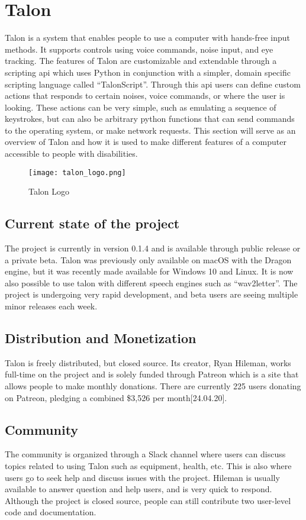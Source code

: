 \documentclass[../thesis.tex]{subfiles}
\begin{document}
\chapter{Talon}\label{talon}

Talon is a system that enables people to use a computer with hands-free input methods.
It supports controls using voice commands, noise input, and eye tracking.
The features of Talon are customizable and extendable through a scripting api which uses Python in conjunction with
a simpler, domain specific scripting language called ``TalonScript''.
Through this api users can define custom actions that responds to certain noises, voice commands, or where the user is looking.
These actions can be very simple, such as emulating a sequence of keystrokes, but can also be arbitrary python functions
that can send commands to the operating system, or make network requests.
This section will serve as an overview of Talon and how it is used to make different features of a computer accessible to people with disabilities.

\begin{figure}[htpb]
    \centering
    \texttt{[image: talon\_logo.png]}
    \caption{Talon Logo}%
    \label{fig:talon_logo}
\end{figure}

\section{Current state of the project}
The project is currently in version 0.1.4 and is available through public release or a private beta.
Talon was previously only available on macOS with the Dragon engine, but it was recently made available for Windows 10 and Linux.
It is now also possible to use talon with different speech engines such as ``wav2letter''.
The project is undergoing very rapid development, and beta users are seeing multiple minor releases each week.

\section{Distribution and Monetization}
Talon is freely distributed, but closed source.
Its creator, Ryan Hileman, works full-time on the project and is solely funded through Patreon which is a site that allows people to make monthly donations.
There are currently 225 users donating on Patreon, pledging a combined \$3,526 per month[24.04.20].

\section{Community}
The community is organized through a Slack channel where users can discuss topics related to using Talon such as equipment, health, etc.
This is also where users go to seek help and discuss issues with the project.
Hileman is usually available to answer question and help users, and is very quick to respond.
Although the project is closed source, people can still contribute two user-level code and documentation.
\end{document}
